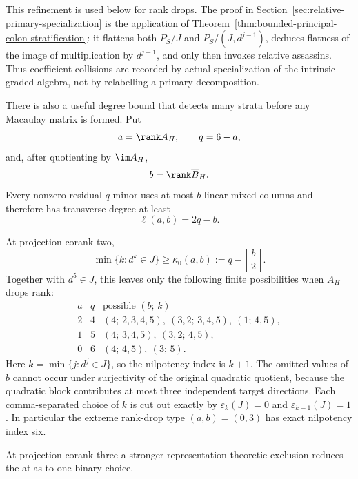 This refinement is used below for rank drops.  The proof in
Section~\ref{sec:relative-primary-specialization} is the application of
Theorem~\ref{thm:bounded-principal-colon-stratification}: it flattens
both \(P_S/J\) and \(P_S/(J,d^{j-1})\), deduces flatness of the image
of multiplication by \(d^{j-1}\), and only then invokes relative
assassins.  Thus coefficient collisions are
recorded by actual specialization of the intrinsic graded algebra,
not by relabelling a primary decomposition.

There is also a useful degree bound that detects many strata before
any Macaulay matrix is formed.  Put
\[
 a=\rank A_H,\qquad q=6-a,
\]
and, after quotienting by \(\im A_H\),
\[
 b=\rank\overline B_H.
\]
Every nonzero residual \(q\)-minor uses at most \(b\) linear mixed
columns and therefore has transverse degree at least
\begin{equation}\label{eq:minimal-transverse-degree}
 \ell(a,b)=2q-b.
\end{equation}

\begin{proposition}
\label{prop:rankdrop-coranktwo-depth}
At projection corank two,
\begin{equation}\label{eq:coranktwo-lower-bound}
 \min\{k:d^k\in J\}\ge
 \kappa_0(a,b):=
 q-\left\lfloor\frac b2\right\rfloor.
\end{equation}
Together with \(d^5\in J\), this leaves only the following finite
possibilities when \(A_H\) drops rank:
\[
\begin{array}{c|c|c}
a&q&\text{possible }(b;\,k)\\ \hline
2&4&(4;\,2,3,4,5),\ (3,2;\,3,4,5),\ (1;\,4,5),\\
1&5&(4;\,3,4,5),\ (3,2;\,4,5),\\
0&6&(4;\,4,5),\ (3;\,5).
\end{array}
\]
Here \(k=\min\{j:d^j\in J\}\), so the nilpotency index is \(k+1\).
The omitted values of \(b\) cannot occur under surjectivity of the
original quadratic quotient, because the quadratic block contributes
at most three independent target directions.
Each comma-separated choice of \(k\) is cut out exactly by
\(\varepsilon_k(J)=0\) and
\(\varepsilon_{k-1}(J)=1\).
In particular the extreme rank-drop type \((a,b)=(0,3)\) has exact
nilpotency index six.
\end{proposition}

At projection corank three a stronger representation-theoretic
exclusion reduces the atlas to one binary choice.

